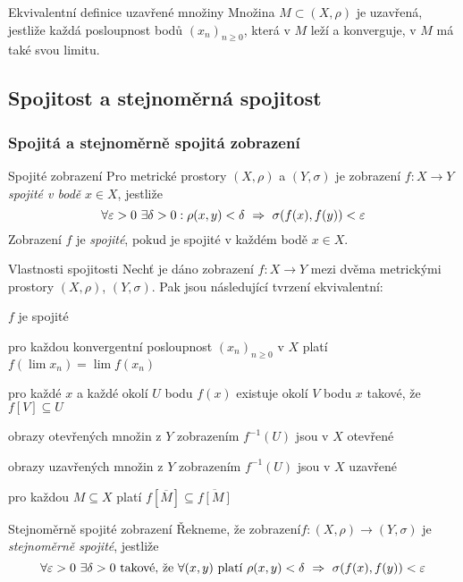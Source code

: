 \begin{poznamkaN}{Ekvivalentní definice uzavřené množiny}
Množina $M\subset(X,\rho)$ je uzavřená, jestliže každá posloupnost bodů $(x_n)_{n\geq 0}$, která v $M$ leží a konverguje, v $M$ má také svou limitu.
\end{poznamkaN}

\subsection{Spojitost a stejnoměrná spojitost}

\subsubsection*{Spojitá a stejnoměrně spojitá zobrazení}

\begin{definiceN}{Spojité zobrazení}
Pro metrické prostory $(X,\rho)$ a $(Y,\sigma)$ je zobrazení $f:X\to Y$ \emph{spojité v bodě} $x\in X$, jestliže
$$\forall\varepsilon>0\ \exists\delta>0: \rho(x,y)<\delta\impl \sigma(f(x),f(y))<\varepsilon$$
Zobrazení $f$ je \emph{spojité}, pokud je spojité v každém bodě $x\in X$.
\end{definiceN}

\begin{vetaN}{Vlastnosti spojitosti}
Nechť je dáno zobrazení $f:X\to Y$ mezi dvěma metrickými prostory $(X,\rho)$, $(Y,\sigma)$. Pak jsou následující tvrzení ekvivalentní:
\begin{penumerate}
    \item $f$ je spojité
    \item pro každou konvergentní posloupnost $(x_n)_{n\geq 0}$ v $X$ platí $f(\lim x_n)=\lim f(x_n)$
    \item pro každé $x$ a každé okolí $U$ bodu $f(x)$ existuje okolí $V$ bodu $x$ takové, že $f[V]\subseteq U$
    \item obrazy otevřených množin z $Y$ zobrazením $f^{-1}(U)$ jsou v $X$ otevřené
    \item obrazy uzavřených množin z $Y$ zobrazením $f^{-1}(U)$ jsou v $X$ uzavřené
    \item pro každou $M\subseteq X$ platí $f[\overline{M}]\subseteq \overline{f[M]}$
\end{penumerate}
\end{vetaN}

\begin{definiceN}{Stejnoměrně spojité zobrazení}
Řekneme, že zobrazení$f:(X,\rho)\to(Y,\sigma)$ je \emph{stejnoměrně spojité}, jestliže
$$\forall\varepsilon>0\ \exists\delta>0\text{ takové, že }\forall(x,y)\text{ platí }\rho(x,y)<\delta\ \Rightarrow\ \sigma(f(x),f(y))<\varepsilon$$
\end{definiceN}

